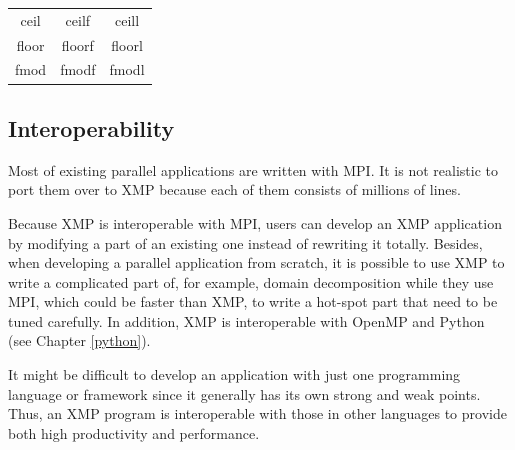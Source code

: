 \begin{table}[h]
\begin{center}
\begin{tabular}{c|c|c}

 ceil & ceilf & ceill \\
 floor & floorf & floorl \\

 fmod & fmodf & fmodl \\ \hline
%
%

 \end{tabular} 
 \end{center}
\end{table}


\subsection{Interoperability}

Most of existing parallel applications are written with MPI. It is not
realistic to port them over to XMP because each of them consists of
millions of lines.

Because XMP is interoperable with MPI, users can develop an XMP
application by modifying a part of an existing one instead of rewriting
it totally. Besides, when developing a parallel application from
scratch, it is possible to use XMP to write a complicated part of, for
example, domain decomposition while they use MPI, which could be faster
than XMP, to write a hot-spot part that need to be tuned carefully. In
addition, XMP is interoperable with OpenMP and Python (see Chapter
\ref{python}).

It might be difficult to develop an application with just one
programming language or framework since it generally has its own strong
and weak points. Thus, an XMP program is interoperable with those in
other languages to provide both high productivity and performance.